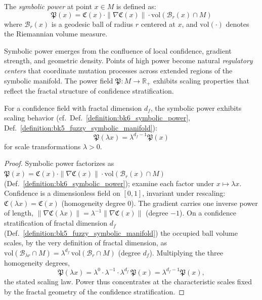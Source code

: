 \begin{definition}
\label{definition:bk6_symbolic_power}
The \emph{symbolic power} at point $x \in M$ is defined as:
\begin{equation}
\mathfrak{P}(x) = \mathfrak{C}(x) \cdot \|\nabla \mathfrak{C}(x)\| \cdot \text{vol}(\mathcal{B}_r(x) \cap M)
\end{equation}
where $\mathcal{B}_r(x)$ is a geodesic ball of radius $r$ centered at $x$, and $\text{vol}(\cdot)$ denotes the Riemannian volume measure.
\end{definition}

Symbolic power emerges from the confluence of local confidence, gradient strength, and geometric density. Points of high power become natural \emph{regulatory centers} that coordinate mutation processes across extended regions of the symbolic manifold. The power field $\mathfrak{P}: M \to \mathbb{R}_+$ exhibits scaling properties that reflect the fractal structure of confidence stratification.

\begin{lemma}
\label{lemma:bk6_power_scaling}
For a confidence field with fractal dimension $d_f$, the symbolic power exhibits scaling behavior (cf.~Def.~\ref{definition:bk6_symbolic_power}, Def.~\ref{definition:bk5_fuzzy_symbolic_manifold}):
\begin{equation}
\mathfrak{P}(\lambda x) = \lambda^{d_f - 1} \mathfrak{P}(x)
\end{equation}
for scale transformations $\lambda > 0$.
\end{lemma}
\begin{proof}
\label{proof:bk6_power_scaling}
\leavevmode
Symbolic power factorizes as $\mathfrak{P}(x)=\mathfrak{C}(x)\cdot\|\nabla\mathfrak{C}(x)\|\cdot\text{vol}(\mathcal{B}_r(x)\cap M)$ (Def.~\ref{definition:bk6_symbolic_power}); examine each factor under $x\mapsto\lambda x$. Confidence is a dimensionless field on $[0,1]$, invariant under rescaling: $\mathfrak{C}(\lambda x)=\mathfrak{C}(x)$ (homogeneity degree $0$). The gradient carries one inverse power of length, $\|\nabla\mathfrak{C}(\lambda x)\|=\lambda^{-1}\|\nabla\mathfrak{C}(x)\|$ (degree $-1$). On a confidence stratification of fractal dimension $d_f$ (Def.~\ref{definition:bk5_fuzzy_symbolic_manifold}) the occupied ball volume scales, by the very definition of fractal dimension, as $\text{vol}(\mathcal{B}_{\lambda r}\cap M)=\lambda^{d_f}\,\text{vol}(\mathcal{B}_r\cap M)$ (degree $d_f$). Multiplying the three homogeneity degrees,
\[
\mathfrak{P}(\lambda x)=\lambda^{0}\cdot\lambda^{-1}\cdot\lambda^{d_f}\,\mathfrak{P}(x)=\lambda^{d_f-1}\mathfrak{P}(x),
\]
the stated scaling law. Power thus concentrates at the characteristic scales fixed by the fractal geometry of the confidence stratification.
\end{proof}


